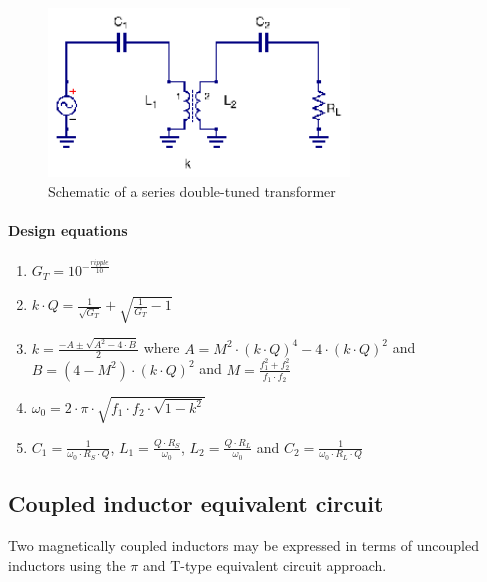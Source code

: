 \begin{figure}[H]
\centering
\includegraphics[width=80mm]{series-double-tuned-transformer}
\caption{Schematic of a series double-tuned transformer}
\label{fig:series-double-tuned-transformer}
\end{figure}

\paragraph{Design equations \cite{RFMW_amp_osc_Abrie}}

\begin{enumerate}
   \item $G_T = 10^{- \frac{ripple}{10}}$
   \item $k\cdot Q = \frac{1}{\sqrt{G_T}} + \sqrt{\frac{1}{G_T} - 1}$
   \item $k = \frac{-A \pm \sqrt{A^2 - 4 \cdot B}}{2}$ where $A = M^2 \cdot (k\cdot Q)^4 - 4 \cdot (k\cdot Q)^2$ and $B = (4 - M^2) \cdot (k\cdot Q)^2$ and $M = \frac{f_1^2 + f_2^2}{f_1 \cdot f_2}$
   \item $\omega_0 = 2 \cdot \pi \cdot \sqrt{f_1 \cdot f_2 \cdot \sqrt{1 - k^2}}$
   \item $C_1 = \frac{1}{\omega_0 \cdot R_S \cdot Q}$, $L_1 = \frac{Q \cdot R_S}{\omega_0}$, $L_2 = \frac{Q \cdot R_L}{\omega_0}$ and $C_2 = \frac{1}{\omega_0 \cdot R_L \cdot Q}$
\end{enumerate}

\subsection{Coupled inductor equivalent circuit}

\noindent Two magnetically coupled inductors may be expressed in terms of uncoupled inductors using the $\pi$ and T-type equivalent circuit approach.

